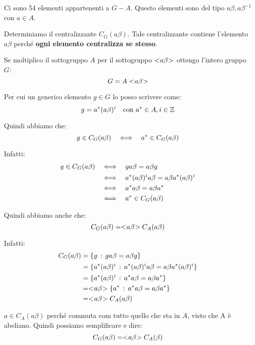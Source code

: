 \begin{soluzione}
    Ci sono 54 elementi appartenenti a $G - A$.
    Questo elementi sono del tipo $a\beta, a\beta^{-1}$ con $a \in A$.

    Determiniamo il centralizzante $C_G(a\beta)$.
    Tale centralizzante contiene l'elemento $a\beta$ perché \textbf{ogni elemento centralizza se stesso}.

    Se moltiplico il sottogruppo $A$ per il sottogruppo $< \negmedspace a\beta \negmedspace >$ ottengo l'intero gruppo $G$:
    \begin{equation*}
        G = A< \negmedspace a\beta \negmedspace >
    \end{equation*}

    Per cui un generico elemento $g \in G$ lo posso scrivere come:
    \begin{equation*}
        g = a^* (a\beta)^i \quad \text{con } a^* \in A, i \in \mathbb{Z}
    \end{equation*}

    Quindi abbiamo che:
    \begin{equation*}
        g \in C_G(a\beta) \quad\Longleftrightarrow\quad a^* \in C_G(a\beta)
    \end{equation*}

    Infatti:
    \begin{align*}
        g \in C_G(a\beta) &\quad\Longleftrightarrow\quad g a \beta = a \beta g \\
        &\quad\Longleftrightarrow\quad a^* (a\beta)^i a \beta = a \beta a^* (a\beta)^i \\
        &\quad\Longleftrightarrow\quad a^* a\beta = a\beta a^* \\
        &\quad\Longleftrightarrow\quad a^* \in C_G(a \beta)
    \end{align*}

    Quindi abbiamo anche che:
    \begin{equation*}
        C_G(a\beta) = < \negmedspace a\beta \negmedspace >C_A(a\beta)
    \end{equation*}

    Infatti:
    \begin{align*}
        C_G(a\beta) &= \{g \,:\, ga\beta = a \beta g\} \\
        &= \{a^* (a\beta)^i \,:\, a^* (a\beta)^i a \beta = a\beta a^* (a\beta)^i \} \\
        &= \{a^* (a\beta)^i \,:\, a^* a \beta = a\beta a^* \} \\
        &= < \negmedspace a\beta \negmedspace > \{a^* \,:\, a^* a\beta = a\beta a^* \} \\
        &= < \negmedspace a\beta \negmedspace > C_A(a\beta)
    \end{align*}

    $a \in C_A(a\beta)$ perché commuta com tutto quello che sta in $A$, visto che A è abeliano.
    Quindi possiamo semplificare e dire:
    \begin{equation*}
        C_G(a\beta) = < \negmedspace a\beta \negmedspace > C_A(\beta)
    \end{equation*}


\end{soluzione}
